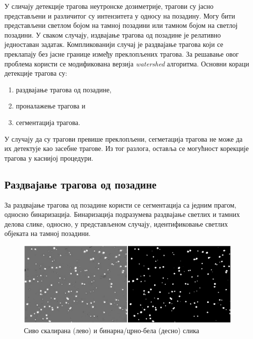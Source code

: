 \documentclass[11pt,a4paper,serbian,oneside]{book}
\begin{document}
У сличају детекције трагова неутронске дозиметрије, трагови су јасно представљени и различитог су интензитета у односу на позадину. Могу бити представљени светлом бојом на тамној позадини или тамном бојом на светлој позадини. У сваком случају, издвајање трагова од позадине је релативно једноставан задатак. Компликованији случај је раздвајање трагова који се преклапају без јасне границе између преклопљених трагова. За решавање овог проблема користи се модификована верзија \textit{watershed} алгоритма. Основни кораци детекције трагова су:
\begin{enumerate}
  \item раздвајање трагова од позадине,
  \item проналажење трагова и
  \item сегментација трагова.
\end{enumerate}

У случају да су трагови превише преклопљени, сегметација трагова не може да их детектује као засебне трагове. Из тог разлога, оставља се могућност корекције трагова у каснијој процедури.

\subsection{Раздвајање трагова од позадине}

За раздвајање трагова од позадине користи се сегментација са једним прагом, односно бинаризација. Бинаризација подразумева раздвајање светлих и тамних делова слике, односно, у представљеном случају, идентификовање светлих објеката на тамној позадини.

\begin{figure}[htb]
\begin{center}
\leavevmode
\includegraphics[width=150mm]{images/binary.png}
\end{center}
\caption{Сиво скалирана (лево) и бинарна/црно-бела (десно) слика}
\label{fig:cv}
\end{figure}
\end{document}
